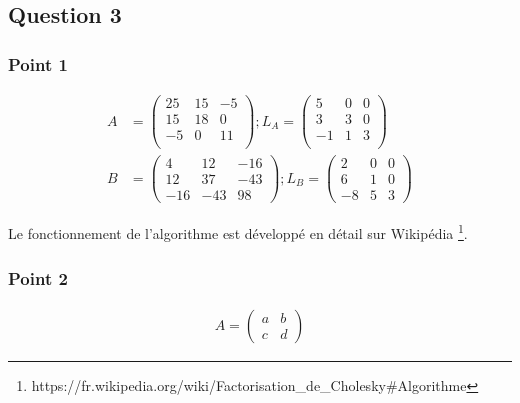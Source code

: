 \subsection{Question 3}

\subsubsection{Point 1}

\begin{equation}
	\begin{aligned}
		A &= 
		\begin{pmatrix}
			25 & 15 & -5\\
			15 & 18 & 0\\
			-5 & 0 & 11\\
		\end{pmatrix};
		L_A = 
		\begin{pmatrix}
			5 & 0 & 0\\
			3 & 3 & 0\\
			-1 & 1 & 3\\
		\end{pmatrix}\\
		B &= 
		\begin{pmatrix}
			4 & 12 & -16\\
			12 & 37 & -43\\
			-16 & -43 & 98
		\end{pmatrix};
		L_B =
		\begin{pmatrix}
			2 & 0 & 0\\
			6 & 1 & 0\\
			-8 & 5 & 3
		\end{pmatrix}
	\end{aligned}
\end{equation}

Le fonctionnement de l'algorithme est développé en détail sur Wikipédia \footnote{https://fr.wikipedia.org/wiki/Factorisation\_de\_Cholesky\#Algorithme}.


\subsubsection{Point 2}

\begin{equation}
	\begin{aligned}
		A=\begin{pmatrix}
		a & b\\
		c & d
		\end{pmatrix}
	\end{aligned}
\end{equation}

